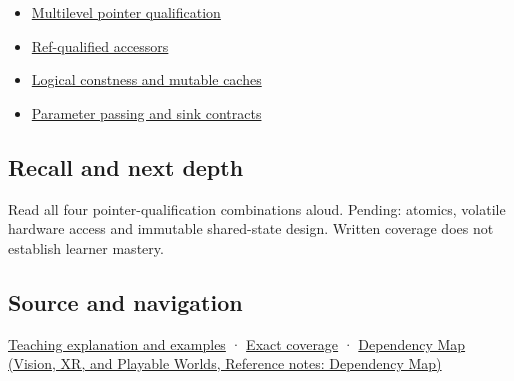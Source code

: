 \begin{itemize}
\tightlist
\item
  \hyperref[appendix-5e1a7561cd98]{Multilevel pointer qualification}
\item
  \hyperref[appendix-d42039b1d6f7]{Ref-qualified accessors}
\item
  \hyperref[appendix-f5593256bcaf]{Logical constness and mutable caches}
\item
  \hyperref[appendix-d5908f75721f]{Parameter passing and sink contracts}
\end{itemize}

\subsection{Recall and next depth}\label{appendix-c25d60fed375-recall-and-next-depth}

\hypertarget{appendix-c25d60fed375-recall-and-next-depth}{}

Read all four pointer-qualification combinations aloud. Pending: atomics, volatile hardware access and immutable shared-state design. Written coverage does not establish learner mastery.

\subsection{Source and navigation}\label{appendix-c25d60fed375-source-and-navigation}

\hypertarget{appendix-c25d60fed375-source-and-navigation}{}

\hyperref[01-foundations-i-ch003-read-only-is-a-path-not-an-ownership-or-synchronization-promise]{Teaching explanation and examples} · \hyperref[appendix-fd090d982a15-m008---parts-113-126]{Exact coverage} · \href{../07-Vision-XR-and-Playable-Worlds/main.pdf\#nameddest=appendix-4ad47bdd269a}{Dependency Map (Vision, XR, and Playable Worlds, Reference notes: Dependency Map)}

